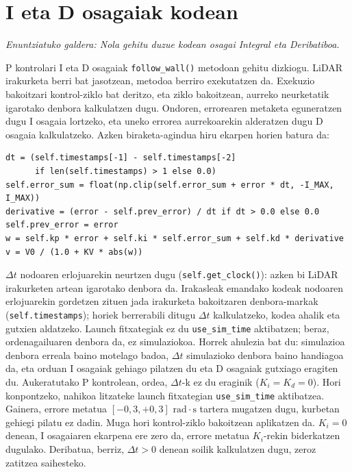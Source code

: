 \section{I eta D osagaiak kodean}\label{sec:pid-kodean}
\noindent\textit{Enuntziatuko galdera: Nola gehitu duzue kodean osagai Integral eta Deribatiboa.}\par

P kontrolari I eta D osagaiak \texttt{follow\_wall()} metodoan gehitu dizkiogu. LiDAR irakurketa berri bat jasotzean, metodoa berriro exekutatzen da. Exekuzio bakoitzari kontrol-ziklo bat deritzo, eta ziklo bakoitzean, aurreko neurketatik igarotako denbora kalkulatzen dugu. Ondoren, errorearen metaketa eguneratzen dugu I osagaia lortzeko, eta uneko errorea aurrekoarekin alderatzen dugu D osagaia kalkulatzeko. Azken biraketa-agindua hiru ekarpen horien batura da:
{\footnotesize
\begin{verbatim}
dt = (self.timestamps[-1] - self.timestamps[-2]
      if len(self.timestamps) > 1 else 0.0)
self.error_sum = float(np.clip(self.error_sum + error * dt, -I_MAX, I_MAX))
derivative = (error - self.prev_error) / dt if dt > 0.0 else 0.0
self.prev_error = error
w = self.kp * error + self.ki * self.error_sum + self.kd * derivative
v = V0 / (1.0 + KV * abs(w))
\end{verbatim}
}
$\Delta t$ nodoaren erlojuarekin neurtzen dugu (\texttt{self.get\_clock()}): azken bi LiDAR irakurketen artean igarotako denbora da. Irakasleak emandako kodeak nodoaren erlojuarekin gordetzen zituen jada irakurketa bakoitzaren denbora-markak (\texttt{self.timestamps}); horiek berrerabili ditugu $\Delta t$ kalkulatzeko, kodea ahalik eta gutxien aldatzeko. Launch fitxategiak ez du \texttt{use\_sim\_time} aktibatzen; beraz, ordenagailuaren denbora da, ez simulaziokoa. Horrek ahulezia bat du: simulazioa denbora erreala baino motelago badoa, $\Delta t$ simulazioko denbora baino handiagoa da, eta orduan I osagaiak gehiago pilatzen du eta D osagaiak gutxiago eragiten du. Aukeratutako P kontrolean, ordea, $\Delta t$-k ez du eraginik ($K_i = K_d = 0$). Hori konpontzeko, nahikoa litzateke launch fitxategian \texttt{use\_sim\_time} aktibatzea. Gainera, errore metatua $[-0{,}3, +0{,}3]\text{ rad}\cdot\text{s}$ tartera mugatzen dugu, kurbetan gehiegi pilatu ez dadin. Muga hori kontrol-ziklo bakoitzean aplikatzen da. $K_i = 0$ denean, I osagaiaren ekarpena ere zero da, errore metatua $K_i$-rekin biderkatzen dugulako. Deribatua, berriz, $\Delta t > 0$ denean soilik kalkulatzen dugu, zeroz zatitzea saihesteko.
